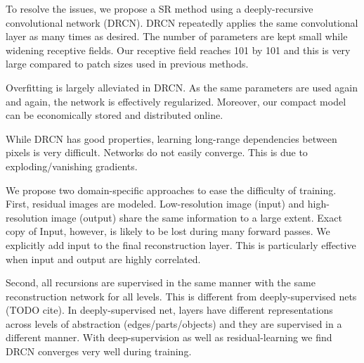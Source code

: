\documentclass[10pt,twocolumn,letterpaper]{article}
\begin{document}
To resolve the issues, we propose a SR method using a deeply-recursive convolutional network (DRCN). DRCN repeatedly applies the same convolutional layer as many times as desired. The number of parameters are kept small while widening receptive fields. Our receptive field reaches 101 by 101 and this is very large compared to patch sizes used in previous methods. 

Overfitting is largely alleviated in DRCN. As the same parameters are used again and again, the network is effectively regularized. Moreover, our compact model can be economically stored and distributed online.   

While DRCN has good properties, learning long-range dependencies between pixels is very difficult. Networks do not easily converge. This is due to exploding/vanishing gradients. 

We propose two domain-specific approaches to ease the difficulty of training. First, residual images are modeled. Low-resolution image (input) and high-resolution image (output) share the same information to a large extent. Exact copy of Input, however, is likely to be lost during many forward passes. We explicitly add input to the final reconstruction layer. This is particularly effective when input and output are highly correlated. 


%
%

Second, all recursions are supervised in the same manner with the same reconstruction network for all levels. This is different from deeply-supervised nets (TODO cite). In deeply-supervised net, layers have different representations across levels of abstraction (edges/parts/objects) and they are supervised in a different manner. With deep-supervision as well as residual-learning we find DRCN converges very well during training. 
\end{document}
